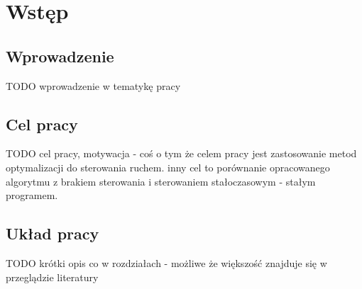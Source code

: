 \chapter{Wstęp}
\section{Wprowadzenie}
TODO wprowadzenie w tematykę pracy
\section{Cel pracy}
TODO cel pracy, motywacja - coś o tym że celem pracy jest zastosowanie metod optymalizacji do sterowania ruchem.
inny cel to porównanie opracowanego algorytmu z brakiem sterowania i sterowaniem stałoczasowym - stałym programem.
\section{Układ pracy}
TODO krótki opis co w rozdziałach - możliwe że większość znajduje się w przeglądzie literatury